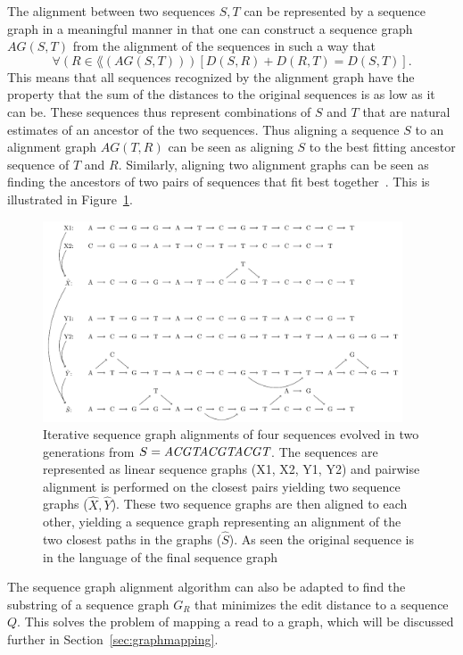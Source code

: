 The alignment between two sequences $S, T$ can be represented by a sequence graph in a meaningful manner in that one can construct a sequence graph $AG(S, T)$ from the alignment of the sequences in such a way that 
\[
\forall (R \in \lang(AG(S, T)))\left[D(S, R)+D(R, T) =  D(S, T)\right].
\]
This means that all sequences recognized by the alignment graph have the property that the sum of the distances to the original sequences is as low as it can be.
These sequences thus represent combinations of $S$ and $T$ that are natural estimates of an ancestor of the two sequences.
Thus aligning a sequence $S$ to an alignment graph $AG(T, R)$  can be seen as aligning $S$ to the best fitting ancestor sequence of $T$ and $R$.
Similarly, aligning two alignment graphs can be seen as finding the ancestors of two pairs of sequences that fit best together~\cite{treealign, poa2}.
This is illustrated in Figure~\ref{fig:treealign}.

\begin{figure}
  \centering
  \includegraphics[width=0.95\textwidth]{figures/graph_msa}

  \caption{
    Iterative sequence graph alignments of four sequences evolved in two generations from $S=\emph{ACGTACGTACGT}$.
    The sequences are represented as linear sequence graphs (X1, X2, Y1, Y2) and pairwise alignment is performed on the closest pairs yielding two sequence graphs ($\hat{X}, \hat{Y}$).
    These two sequence graphs are then aligned to each other, yielding a sequence graph representing an alignment of the two closest paths in the graphs ($\hat{S}$).
    As seen the original sequence is in the language of the final sequence graph}
  \label{fig:treealign}
\end{figure}

The sequence graph alignment algorithm can also be adapted to find the substring of a sequence graph $G_R$ that minimizes the edit distance to a sequence $Q$.
This solves the problem of mapping a read to a graph, which will be discussed further in Section~\ref{sec:graphmapping}.


